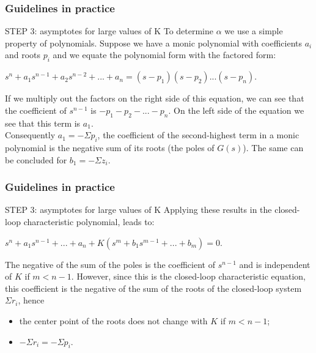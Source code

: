 \begin{frame}
	\frametitle{Guidelines in practice}
	\begin{block}{STEP 3: asymptotes for large values of K}
		To determine $\alpha$ we use a simple property of polynomials. Suppose we have a monic polynomial with coefficients $a_i$ and roots $p_i$ and we equate the polynomial form with the factored form:
		\begin{center}
			$s^n + a_1s^{n-1} + a_2s^{n-2} + ... + a_n = (s-p_1)(s-p_2)...(s-p_n).$
		\end{center}
		If we multiply out the factors on the right side of this equation, we can see that the coefficient of $s^{n-1}$ is $-p_1 - p_2 - ... - p_n$. On the left side of the equation we see that this term is $a_1$.\\
		\vspace{1em}
		Consequently $a_1 = -\Sigma p_i$, the coefficient of the second-highest term in a monic polynomial is the negative sum of its roots (the poles of $G(s)$). The same can be concluded for $b_1 = -\Sigma z_i$.
	\end{block}
\end{frame}

\begin{frame}
	\frametitle{Guidelines in practice}
	\begin{block}{STEP 3: asymptotes for large values of K}
		Applying these results in the closed-loop characteristic polynomial, leads to:
		\begin{center}
			$s^n + a_1 s^{n-1} + ... + a_n + K(s^m + b_1 s^{m-1} + ... + b_m) = 0$.
		\end{center}
		The negative of the sum of the poles is the coefficient of $s^{n-1}$ and is independent of $K$ if $m < n-1$. However, since this is the closed-loop characteristic equation, this coefficient is the negative of the sum of the roots of the closed-loop system $\Sigma r_i$, hence
		\begin{itemize}
			\item the center point of the roots does not change with $K$ if $m < n-1$;
			\item $-\Sigma r_i = -\Sigma p_i$.
		\end{itemize}
		\end{block}
\end{frame}

